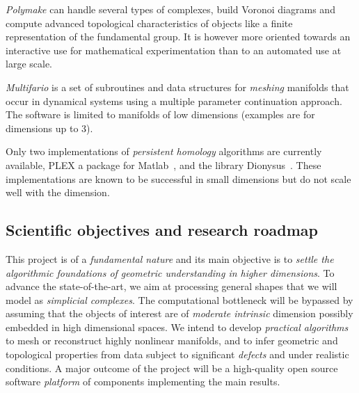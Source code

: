  {\em Polymake} can handle several types of complexes, build Voronoi diagrams and compute advanced topological characteristics of objects like a finite representation of the fundamental group. It is however more oriented towards an interactive use for mathematical experimentation 
than to an automated use at large scale.%

{\em Multifario} is a set of subroutines and data structures for {\em meshing} manifolds that occur in dynamical systems using a multiple parameter continuation approach. The software is limited to manifolds of low dimensions (examples are for dimensions up to 3). 

Only two implementations of {\em persistent homology} algorithms are currently available, PLEX a package for Matlab~\cite{}, and  the library Dionysus~\cite{}. These implementations are known to be successful in small dimensions but do not scale well with the dimension. %

\subsection{Scientific objectives and research roadmap} 

This project is of a {\em fundamental nature} and its main objective is to {\em settle the algorithmic foundations of geometric understanding in higher dimensions}. To advance the state-of-the-art, we aim at processing general shapes that we will model  as {\em simplicial complexes}. The computational bottleneck will be bypassed by assuming that the objects of interest are of {\em moderate intrinsic} dimension possibly embedded in high dimensional spaces. We intend to develop {\em practical algorithms} to mesh or reconstruct highly nonlinear manifolds, and to infer geometric and topological properties from data subject to significant {\em defects} and
 under realistic conditions. A major outcome of the project will be a high-quality open source software {\em platform} of components implementing the main results.


